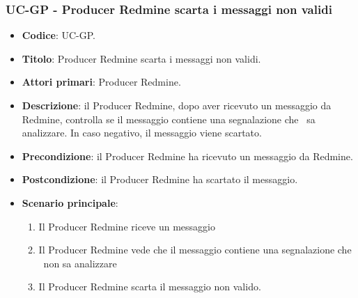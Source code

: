 \subsubsection{UC\theuccount-GP - Producer Redmine scarta i messaggi non validi}

\begin{itemize}
	\item \textbf{Codice}: UC\theuccount-GP.
	\item \textbf{Titolo}: Producer Redmine scarta i messaggi non validi.
	\item \textbf{Attori primari}: Producer Redmine.
	\item \textbf{Descrizione}: il Producer Redmine, dopo aver ricevuto un messaggio da Redmine, controlla
	se il messaggio contiene una segnalazione che \progetto\ sa analizzare. In caso negativo, il messaggio viene scartato.
	\item \textbf{Precondizione}: il Producer Redmine ha ricevuto un messaggio da Redmine.
	\item \textbf{Postcondizione}: il Producer Redmine ha scartato il messaggio.
	\item \textbf{Scenario principale}:
	\begin{enumerate}
		\item Il Producer Redmine riceve un messaggio
		\item Il Producer Redmine vede che il messaggio contiene una segnalazione che \progetto\ non sa analizzare
		\item Il Producer Redmine scarta il messaggio non valido.
	\end{enumerate}
\end{itemize}